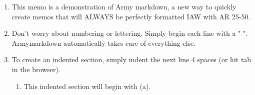 \documentclass[12pt]{article}
\begin{document}
\begin{enumerate}
\item This memo is a demonstration of Army markdown, a new way to quickly create memos that will ALWAYS be perfectly formatted IAW with AR 25-50.
\item Don't worry about numbering or lettering. Simply begin each line with a "-". Armymarkdown automatically takes care of everything else.
\item To create an indented section, simply indent the next line 4 spaces (or hit tab in the browser).

\begin{enumerate}
\item This indented section will begin with (a).
\end{enumerate}
\end{enumerate}
\end{document}
